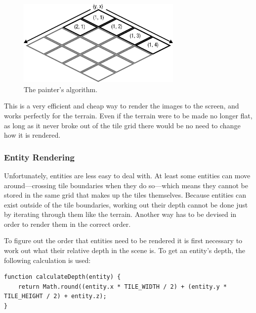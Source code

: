 \begin{figure}[H]
    \centering
    \includegraphics[width=8cm]{Images/painters_algo.eps}
    \caption{The painter's algorithm.}
    \label{fig:painters_algo}
\end{figure}

This is a very efficient and cheap way to render the images to the screen, and works perfectly for the terrain. Even if the terrain were to be made no longer flat, as long as it never broke out of the tile grid there would be no need to change how it is rendered.

\subsubsection{Entity Rendering}\label{entity_rendering}
Unfortunately, entities are less easy to deal with. At least some entities can move around---crossing tile boundaries when they do so---which means they cannot be stored in the same grid that makes up the tiles themselves. Because entities can exist outside of the tile boundaries, working out their depth cannot be done just by iterating through them like the terrain. Another way has to be devised in order to render them in the correct order.

To figure out the order that entities need to be rendered it is first necessary to work out what their relative depth in the scene is. To get an entity's depth, the following calculation is used:

\noindent
\begin{minipage}{\linewidth}
\begin{lstlisting}[style=js, caption={Calculation to work out an entity's relative depth in the scene.}, label=calculate_depth]
function calculateDepth(entity) {
    return Math.round((entity.x * TILE_WIDTH / 2) + (entity.y * TILE_HEIGHT / 2) + entity.z);
}
\end{lstlisting}
\end{minipage}

